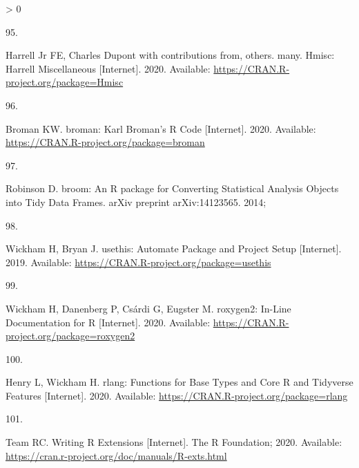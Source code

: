 \documentclass[10pt,letterpaper]{article}
\newlength{\csllabelwidth}
\newlength{\cslhangindent}
\newenvironment{CSLReferences}[3] %
 {%
  \setlength{\parindent}{0pt}
  \ifodd #1 \everypar{\setlength{\hangindent}{\cslhangindent}}\ignorespaces\fi
  \ifnum #2 > 0
  \setlength{\parskip}{#2\baselineskip}
  \fi
 }%
 {}
\newcommand{\CSLLeftMargin}[1]{\parbox[t]{\csllabelwidth}{#1}}
\newcommand{\CSLRightInline}[1]{\parbox[t]{\linewidth - \csllabelwidth}{#1}}
\begin{document}
\begin{CSLReferences}{0}{0}
\leavevmode\hypertarget{ref-Hmisc}{}%
\CSLLeftMargin{95. }
\CSLRightInline{Harrell Jr FE, Charles Dupont with contributions from,
others. many. {Hmisc: Harrell Miscellaneous} {[}Internet{]}. 2020.
Available: \url{https://CRAN.R-project.org/package=Hmisc}}

\leavevmode\hypertarget{ref-broman}{}%
\CSLLeftMargin{96. }
\CSLRightInline{Broman KW. {broman: Karl Broman's R Code}
{[}Internet{]}. 2020. Available:
\url{https://CRAN.R-project.org/package=broman}}

\leavevmode\hypertarget{ref-robinson2014}{}%
\CSLLeftMargin{97. }
\CSLRightInline{Robinson D. {broom: An R package for Converting
Statistical Analysis Objects into Tidy Data Frames}. arXiv preprint
arXiv:14123565. 2014; }

\leavevmode\hypertarget{ref-usethis}{}%
\CSLLeftMargin{98. }
\CSLRightInline{Wickham H, Bryan J. {usethis: Automate Package and
Project Setup} {[}Internet{]}. 2019. Available:
\url{https://CRAN.R-project.org/package=usethis}}

\leavevmode\hypertarget{ref-roxygen2}{}%
\CSLLeftMargin{99. }
\CSLRightInline{Wickham H, Danenberg P, Csárdi G, Eugster M. {roxygen2:
In-Line Documentation for R} {[}Internet{]}. 2020. Available:
\url{https://CRAN.R-project.org/package=roxygen2}}

\leavevmode\hypertarget{ref-rlang}{}%
\CSLLeftMargin{100. }
\CSLRightInline{Henry L, Wickham H. {rlang: Functions for Base Types and
Core R and Tidyverse Features} {[}Internet{]}. 2020. Available:
\url{https://CRAN.R-project.org/package=rlang}}

\leavevmode\hypertarget{ref-Rcore2020}{}%
\CSLLeftMargin{101. }
\CSLRightInline{Team RC. {Writing R Extensions} {[}Internet{]}. The R
Foundation; 2020. Available:
\url{https://cran.r-project.org/doc/manuals/R-exts.html}}

\end{CSLReferences}

\nolinenumbers
\end{document}
